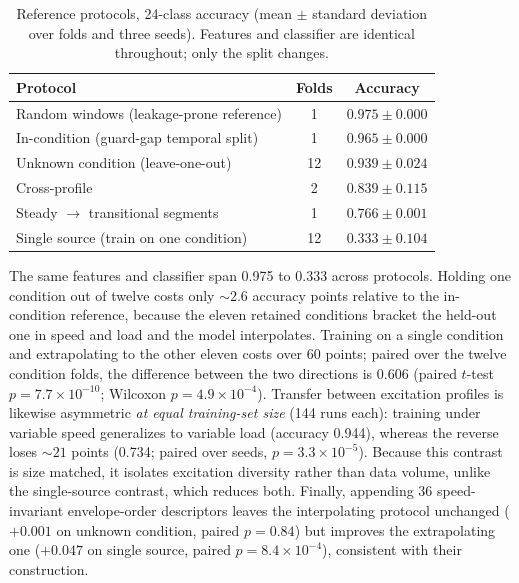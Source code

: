 \begin{table}[!t]
\caption{Reference protocols, 24-class accuracy (mean $\pm$ standard deviation
over folds and three seeds). Features and classifier are identical
throughout; only the split changes.}
\label{tab:condref}
\centering
\footnotesize
\setlength{\tabcolsep}{5pt}
\begin{tabular}{l c c}
\toprule
Protocol & Folds & Accuracy \\
\midrule
Random windows (leakage-prone reference)   & 1  & $0.975 \pm 0.000$ \\
In-condition (guard-gap temporal split)    & 1  & $0.965 \pm 0.000$ \\
Unknown condition (leave-one-out)          & 12 & $0.939 \pm 0.024$ \\
Cross-profile                              & 2  & $0.839 \pm 0.115$ \\
Steady $\rightarrow$ transitional segments & 1  & $0.766 \pm 0.001$ \\
Single source (train on one condition)     & 12 & $0.333 \pm 0.104$ \\
\bottomrule
\end{tabular}
\end{table}

The same features and classifier span 0.975 to 0.333 across protocols.
Holding one condition out of twelve costs only ${\sim}2.6$ accuracy points
relative to the in-condition reference, because the eleven retained
conditions bracket the held-out one in speed and load and the model
interpolates. Training on a single condition and extrapolating to the other
eleven costs over 60 points; paired over the twelve condition folds, the
difference between the two directions is 0.606 (paired $t$-test
$p = 7.7\times10^{-10}$; Wilcoxon $p = 4.9\times10^{-4}$). Transfer between
excitation profiles is likewise asymmetric \emph{at equal training-set size}
(144 runs each): training under variable speed generalizes to variable load
(accuracy 0.944), whereas the reverse loses ${\sim}21$ points (0.734; paired
over seeds, $p = 3.3\times10^{-5}$). Because this contrast is size matched, it
isolates excitation diversity rather than data volume, unlike the
single-source contrast, which reduces both. Finally, appending 36
speed-invariant envelope-order descriptors leaves the interpolating protocol
unchanged ($+0.001$ on unknown condition, paired $p = 0.84$) but improves the
extrapolating one ($+0.047$ on single source, paired
$p = 8.4\times10^{-4}$), consistent with their construction.

